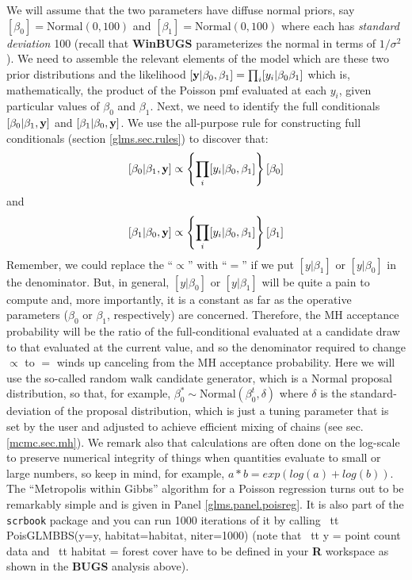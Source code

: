 We will assume that the two parameters have diffuse
normal priors, say $[\beta_0] = \mbox{Normal}(0,100)$ and
$[\beta_1]=\mbox{Normal}(0,100)$ where each has {\it standard deviation}
100 (recall that {\bf WinBUGS} parameterizes the normal in terms of $1/\sigma^{2}$).
We need to assemble the relevant elements of the model which are these
two prior distributions and the
likelihood $[{\bf y}|\beta_0,\beta_1] = \prod_{i} [y_i|\beta_0 \beta_1] $ which is,
mathematically, the product of the Poisson pmf evaluated at each $y_i$,
given particular values of $\beta_0$ and $\beta_1$.
Next, we need to identify the full conditionals
$[\beta_0|\beta_1, {\bf y}]$ and $[\beta_1|\beta_0,{\bf y}]$.  We use the all-purpose
rule for constructing full conditionals
(section \ref{glms.sec.rules})
 to discover that:
\[
 [\beta_0|\beta_1,{\bf y}] \propto \left\{ \prod_{i} [y_{i}|\beta_0,\beta_1]\right\}[\beta_0]
\]
and
\[
 [\beta_1|\beta_0,{\bf y}] \propto \left\{ \prod_{i}
   [y_{i}|\beta_0,\beta_1]\right\} [\beta_1]
\]
Remember, we could replace the ``$\propto$'' with ``$=$'' if we
put $[y|\beta_1]$ or $[y|\beta_0]$ in the denominator. But, in general,
$[y|\beta_0]$ or $[y|\beta_1]$ will be quite a pain to compute and, more
importantly, it is a constant as far as the operative parameters
($\beta_0$ or $\beta_1$,
respectively) are concerned. Therefore,
the MH acceptance probability will be the ratio of the
full-conditional evaluated at a candidate draw to that evaluated at the
current value, and so the denominator required to change $\propto$ to $=$
winds up canceling from the MH acceptance probability.
Here we will
use the so-called random walk candidate generator, which is a Normal proposal distribution, so that, for example,
 $\beta_0^{*} \sim \mbox{Normal}(\beta_0^{t},\delta)$ where $\delta$ is
 the standard-deviation of the proposal distribution, which is just a
 tuning parameter that is set by the user and adjusted to achieve
 efficient mixing of chains (see sec. \ref{mcmc.sec.mh}).
We remark also that calculations are often done on the log-scale to
preserve numerical integrity of things when quantities evaluate to
small or large numbers, so keep in mind, for example,
$a*b = exp(log(a) + log(b))$.
 The ``Metropolis within
Gibbs'' algorithm for a Poisson regression turns out to be remarkably
simple and is given in Panel \ref{glms.panel.poisreg}. It is also part
of the {\tt scrbook} package and you can run 1000 iterations of it by
calling {\ tt PoisGLMBBS(y=y, habitat=habitat, niter=1000)} (note that
{\ tt y} = point count data and {\ tt habitat} = forest cover have to
be defined in your {\bf R} workspace as shown in  the {\bf BUGS} 
analysis above). 

